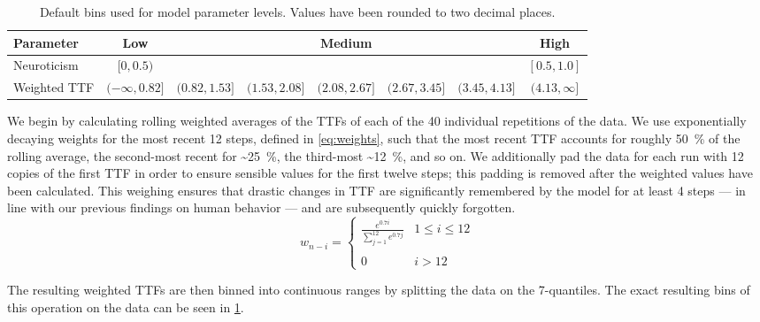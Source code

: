\begin{table}[]
    \centering
    \caption{%
        Default bins used for model parameter levels.
        Values have been rounded to two decimal places.
    }
    \label{tab:defaultbins}
    \begin{tabular}{@{}lccccccc@{}}
        \toprule
        \textbf{Parameter} & \textbf{Low} & & & \textbf{Medium} & & & \textbf{High}         \\ \midrule
        Neuroticism        & \( [0, 0.5) \) & & & & & & \( [0.5, 1.0] \)      \\
        Weighted TTF & \((-\infty, 0.82]\) & \((0.82, 1.53]\) & \((1.53, 2.08]\) & \((2.08, 2.67]\) & \((2.67, 3.45]\) & \((3.45, 4.13]\) & \((4.13, \infty]\)
    \end{tabular}
\end{table}

We begin by calculating rolling weighted averages of the \acp{TTF} of each of the \num{40} individual repetitions of the data.
We use exponentially decaying weights for the most recent \num{12} steps, defined in \cref{eq:weights}, such that the most recent \ac{TTF} accounts for roughly \SI{50}{\percent} of the rolling average, the second-most recent for \textasciitilde\SI{25}{\percent}, the third-most \textasciitilde\SI{12}{\percent}, and so on.
We additionally pad the data for each run with \num{12} copies of the first \ac{TTF} in order to ensure sensible values for the first twelve steps; this padding is removed after the weighted values have been calculated.
This weighing ensures that drastic changes in \ac{TTF} are significantly remembered by the model for at least \num{4} steps --- in line with our previous findings on human behavior --- and are subsequently quickly forgotten.
\begin{equation}\label{eq:weights}
    w_{n - i} = 
    \left\{ \begin{array}{ll}
        \frac{e^{0.7 i}}{\sum\limits^{12}_{j=1} e^{0.7 j}} & 1 \leq i \leq 12 \\
        & \\
        0 & i > 12
    \end{array} \right.
\end{equation}

The resulting weighted \acp{TTF} are then binned into continuous ranges by splitting the data on the \num{7}-quantiles.
The exact resulting bins of this operation on the data can be seen in \cref{tab:defaultbins}.

